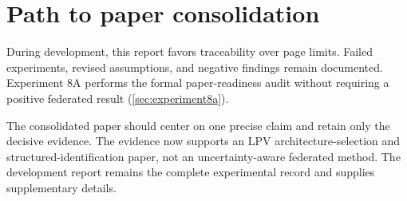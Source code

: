 \section{Path to paper consolidation}
During development, this report favors traceability over page limits. Failed
experiments, revised assumptions, and negative findings remain documented.
Experiment 8A performs the formal paper-readiness audit without requiring a
positive federated result (\cref{sec:experiment8a}).

The consolidated paper should center on one precise claim and retain only the
decisive evidence. The evidence now supports an LPV architecture-selection and
structured-identification paper, not an uncertainty-aware federated method.
The development report remains the complete experimental record and supplies
supplementary details.

